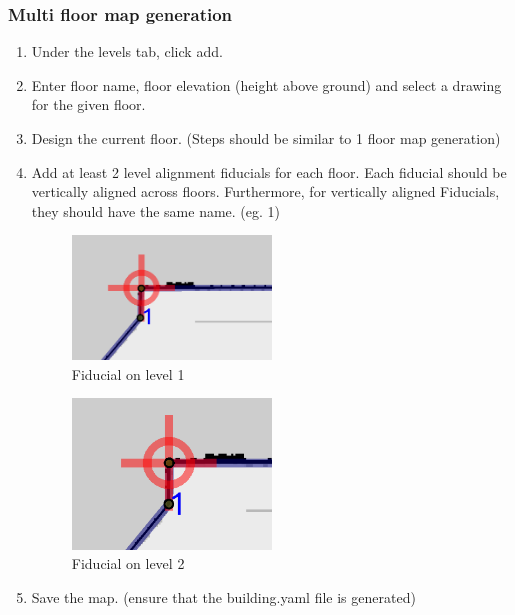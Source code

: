 \documentclass[11pt]{article}
\begin{document}
\subsubsection{Multi floor map generation}
\begin{enumerate}
 \item {Under the levels tab, click add.}
 \item {Enter floor name, floor elevation (height above ground) and select a drawing for the given floor.}
 \item {Design the current floor. (Steps should be similar to 1 floor map generation)}
 \item {
       Add at least 2 level alignment  fiducials for each floor. Each fiducial should be vertically aligned across floors.
       Furthermore, for vertically aligned Fiducials, they should have the same name. (eg. 1)
       \begin{figure}[H]
        \centering
        \includegraphics[width=0.5\textwidth]{images/Level1Fucd}
        \caption{Fiducial on level 1}
       \end{figure}

       \begin{figure}[H]
        \centering
        \includegraphics[width=0.5\textwidth]{images/Level2Fucd}
        \caption{Fiducial on level 2}
       \end{figure}
       }
 \item {Save the map. (ensure that the building.yaml file is generated)}
\end{enumerate}
\end{document}
